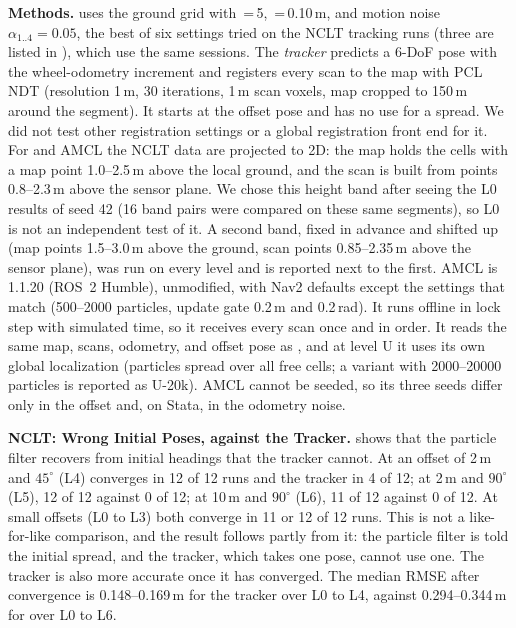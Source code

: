 \noindent\textbf{Methods.}  uses the ground grid with \,=\,5, \,=\,0.10\,m, and motion noise $\alpha_{1..4}=0.05$, the best of six settings tried on the NCLT tracking runs (three are listed in ), which use the same sessions. The \emph{tracker} predicts a 6-DoF pose with the wheel-odometry increment and registers every scan to the map with PCL NDT \citep{rusu2011pcl} (resolution 1\,m, 30 iterations, 1\,m scan voxels, map cropped to 150\,m around the segment). It starts at the offset pose and has no use for a spread. We did not test other registration settings or a global registration front end for it. For  and AMCL the NCLT data are projected to 2D: the map holds the cells with a map point 1.0--2.5\,m above the local ground, and the scan is built from points 0.8--2.3\,m above the sensor plane. We chose this height band after seeing the L0 results of seed 42 (16 band pairs were compared on these same segments), so L0 is not an independent test of it. A second band, fixed in advance and shifted up (map points 1.5--3.0\,m above the ground, scan points 0.85--2.35\,m above the sensor plane), was run on every level and is reported next to the first. AMCL is  1.1.20 (ROS~2 Humble), unmodified, with Nav2 defaults except the settings that match  (500--2000 particles, update gate 0.2\,m and 0.2\,rad). It runs offline in lock step with simulated time, so it receives every scan once and in order. It reads the same map, scans, odometry, and offset pose as , and at level U it uses its own global localization (particles spread over all free cells; a variant with 2000--20000 particles is reported as U-20k). AMCL cannot be seeded, so its three seeds differ only in the offset and, on Stata, in the odometry noise.




\noindent\textbf{NCLT: Wrong Initial Poses,  against the Tracker.}  shows that the particle filter recovers from initial headings that the tracker cannot. At an offset of 2\,m and $45^\circ$ (L4)  converges in 12 of 12 runs and the tracker in 4 of 12; at 2\,m and $90^\circ$ (L5), 12 of 12 against 0 of 12; at 10\,m and $90^\circ$ (L6), 11 of 12 against 0 of 12. At small offsets (L0 to L3) both converge in 11 or 12 of 12 runs. This is not a like-for-like comparison, and the result follows partly from it: the particle filter is told the initial spread, and the tracker, which takes one pose, cannot use one. The tracker is also more accurate once it has converged. The median RMSE after convergence is 0.148--0.169\,m for the tracker over L0 to L4, against 0.294--0.344\,m for  over L0 to L6.


